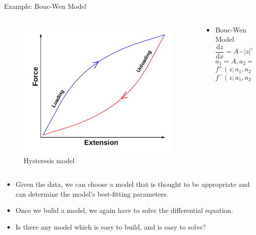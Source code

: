 \documentclass[9pt]{beamer}
\newcounter{frame}[frame]
\begin{document}
\begin{frame}{Example: Bouc-Wen Model}
\begin{columns}
\begin{column}{0.4\textwidth}
\begin{figure}
	\includegraphics[height=.55\textheight]{example01}
	\caption{Hysteresis model}
\end{figure}
\end{column}
\begin{column}{0.6\textwidth}  %
\begin{itemize}
	\item Bouc-Wen Model
	\[\frac{\mathrm dz}{\mathrm dx}=
A-\vert z\vert^n[\gamma-\beta\mathrm{sgn}(z\mathrm dx)]\]
\noindent \[a_1=A,a_2=\beta,a_3=\gamma,a_4=n,\]
	\[f^+(z;a_1,a_2,a_3,a_4)= a_1 - \vert z\vert^{a_4}(a_3 - a_2)\]
	\[f^-(z;a_1,a_2,a_3,a_4)= a_1 - \vert z\vert^{a_4}(a_3 + a_2)\]	
\end{itemize}
\end{column}
\end{columns}
\begin{itemize}
	\item Given the data, we can choose a model that is thought to be appropriate and can determine the model's best-fitting parameters.
	\item Once we bulid a model, we again have to solve the differential equation. 
	\item Is there any model which is easy to build, and is easy to solve?
\end{itemize}

\end{frame}
\end{document}
